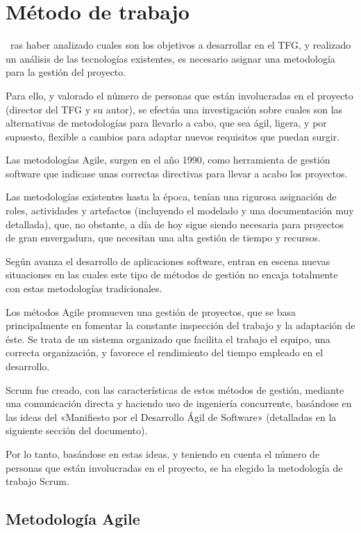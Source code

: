 \chapter{Método de trabajo}
\label{chap:metodo}
~ras haber analizado cuales son los objetivos a desarrollar en el TFG, y realizado un análisis de las tecnologías existentes, es necesario asignar una metodología para la gestión del proyecto. 

Para ello, y valorado el número de personas que están involucradas en el proyecto (director del TFG y su autor), se efectúa una investigación sobre cuales son las alternativas de metodologías para llevarlo a cabo, que sea ágil, ligera, y por supuesto, flexible a cambios para adaptar nuevos requisitos que puedan surgir.

Las metodologías Agile, surgen en el año 1990, como herramienta de gestión software que indicase unas correctas directivas para llevar a acabo los proyectos. 

Las metodologías existentes hasta la época, tenían una rigurosa asignación de roles, actividades y artefactos (incluyendo el modelado y una documentación muy detallada), que, no obstante, a día de hoy sigue siendo necesaria para proyectos de gran envergadura, que necesitan una alta gestión de tiempo y recursos. 

Según avanza el desarrollo de aplicaciones software, entran en escena nuevas situaciones en las cuales este tipo de métodos de gestión no encaja totalmente con estas metodologías tradicionales. 

Los métodos Agile promueven una gestión de proyectos, que se basa principalmente en fomentar la constante inspección del trabajo y la adaptación de éste. Se trata de un sistema organizado que facilita el trabajo el equipo, una correcta organización, y favorece el rendimiento del tiempo empleado en el desarrollo.

Scrum fue creado, con las características de estos métodos de gestión, mediante una comunicación directa y haciendo uso de ingeniería concurrente, basándose en las ideas del «Manifiesto por el Desarrollo Ágil de Software» (detalladas en la siguiente sección del documento).

Por lo tanto, basándose en estas ideas, y teniendo en cuenta el número de personas que están involucradas en el proyecto, se ha elegido la metodología de trabajo Scrum.


\section{Metodología Agile}



